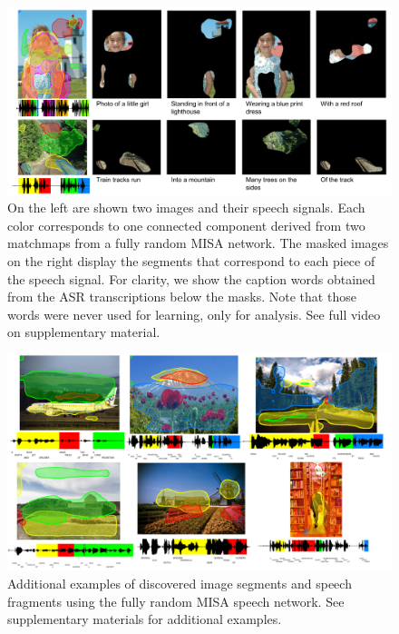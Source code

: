 \begin{figure}
    \includegraphics[width=1\linewidth]{figures/images_paper/coseg_masks.png}
\vspace{-.2in}
    \caption[Localization of each piece of audio in the image]{On the left are shown two images and their speech signals. Each color corresponds to one connected component derived from two matchmaps from a fully random MISA network. The masked images on the right display the segments that correspond to each piece of the speech signal. For clarity, we show the caption words obtained from the ASR transcriptions below the masks. Note that those words were never used for learning, only for analysis. See full video on supplementary material.}
    \label{fig:matchmapvis}
\end{figure}

\begin{figure}
    \includegraphics[width=1\linewidth]{figures/images_paper/coseg_six.png}
\vspace{-.3in}
\caption[Additional examples of discovered image segments and speech fragments]{Additional examples of discovered image segments and speech fragments using the fully random MISA speech network. See supplementary materials for additional examples.}
    \label{fig:matchmapvis2}
\end{figure}


